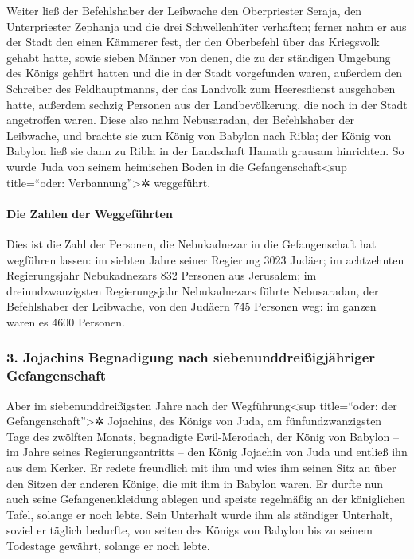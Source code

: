 Weiter ließ der Befehlshaber der Leibwache den
Oberpriester Seraja, den Unterpriester Zephanja und die drei
Schwellenhüter verhaften; ferner nahm er aus der Stadt
den einen Kämmerer fest, der den Oberbefehl über das Kriegsvolk gehabt
hatte, sowie sieben Männer von denen, die zu der ständigen Umgebung des
Königs gehört hatten und die in der Stadt vorgefunden waren, außerdem
den Schreiber des Feldhauptmanns, der das Landvolk zum Heeresdienst
ausgehoben hatte, außerdem sechzig Personen aus der Landbevölkerung, die
noch in der Stadt angetroffen waren. Diese also nahm
Nebusaradan, der Befehlshaber der Leibwache, und brachte sie zum König
von Babylon nach Ribla; der König von Babylon ließ sie
dann zu Ribla in der Landschaft Hamath grausam hinrichten. So wurde Juda
von seinem heimischen Boden in die Gefangenschaft\textless sup
title=``oder: Verbannung''\textgreater✲ weggeführt.

\hypertarget{die-zahlen-der-weggefuxfchrten}{%
\paragraph{Die Zahlen der
Weggeführten}\label{die-zahlen-der-weggefuxfchrten}}

Dies ist die Zahl der Personen, die Nebukadnezar in die
Gefangenschaft hat wegführen lassen: im siebten Jahre seiner Regierung
3023 Judäer; im achtzehnten Regierungsjahr Nebukadnezars
832 Personen aus Jerusalem; im dreiundzwanzigsten
Regierungsjahr Nebukadnezars führte Nebusaradan, der Befehlshaber der
Leibwache, von den Judäern 745 Personen weg: im ganzen waren es 4600
Personen.

\hypertarget{jojachins-begnadigung-nach-siebenunddreiuxdfigjuxe4hriger-gefangenschaft}{%
\subsubsection{3. Jojachins Begnadigung nach siebenunddreißigjähriger
Gefangenschaft}\label{jojachins-begnadigung-nach-siebenunddreiuxdfigjuxe4hriger-gefangenschaft}}

Aber im siebenunddreißigsten Jahre nach der
Wegführung\textless sup title=``oder: der Gefangenschaft''\textgreater✲
Jojachins, des Königs von Juda, am fünfundzwanzigsten Tage des zwölften
Monats, begnadigte Ewil-Merodach, der König von Babylon -- im Jahre
seines Regierungsantritts -- den König Jojachin von Juda und entließ ihn
aus dem Kerker. Er redete freundlich mit ihm und wies ihm
seinen Sitz an über den Sitzen der anderen Könige, die mit ihm in
Babylon waren. Er durfte nun auch seine
Gefangenenkleidung ablegen und speiste regelmäßig an der königlichen
Tafel, solange er noch lebte. Sein Unterhalt wurde ihm
als ständiger Unterhalt, soviel er täglich bedurfte, von seiten des
Königs von Babylon bis zu seinem Todestage gewährt, solange er noch
lebte.
